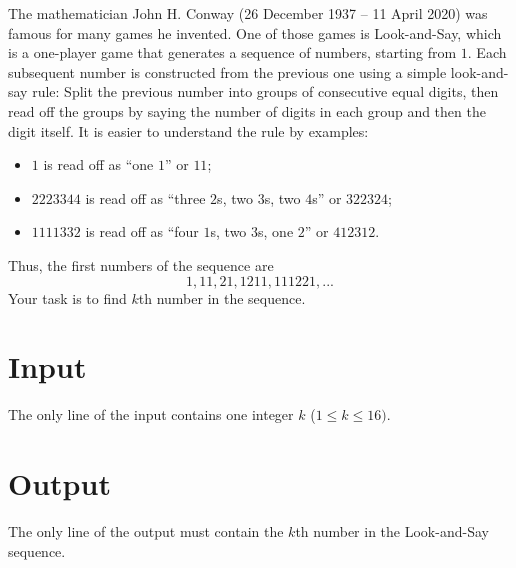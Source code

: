 The mathematician John H. Conway (26 December 1937 – 11 April 2020) was famous for many games he invented.
One of those games is Look-and-Say, which is a one-player game that generates a sequence of numbers, starting from $1$.
Each subsequent number is constructed from the previous one using a simple look-and-say rule:
Split the previous number into groups of consecutive equal digits, then read off the groups by saying the number of digits in each group and then the digit itself.
It is easier to understand the rule by examples:
\begin{itemize}
    \item $1$ is read off as ``one $1$'' or $11$;
    \item $2223344$ is read off as ``three $2$s, two $3$s, two $4$s'' or $322324$;
    \item $1111332$ is read off as ``four $1$s, two $3$s, one $2$'' or $412312$.
\end{itemize}
Thus, the first numbers of the sequence are
\[
    1, 11, 21, 1211, 111221, ...
\]
Your task is to find $k$th number in the sequence.

\section*{Input}
The only line of the input contains one integer $k$ ($1 \leq k \leq 16)$.
\section*{Output}
The only line of the output must contain the $k$th number in the Look-and-Say sequence.

{
}

